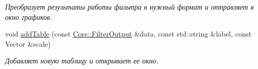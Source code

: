 \begin{DoxyCompactItemize}
\begin{DoxyCompactList}\small\item\em Преобразует результаты работы фильтра в нужный формат и отправляет в окно графиков. \end{DoxyCompactList}\item 
void \hyperlink{class_main_window_a2f45111c96d439beba735cd84e8deda7}{add\+Table} (const \hyperlink{namespace_core_a60877581a235fc9566087b54d463ce9c}{Core\+::\+Filter\+Output} \&data, const std\+::string \&label, const Vector \&scale)\hypertarget{class_main_window_a2f45111c96d439beba735cd84e8deda7}{}\label{class_main_window_a2f45111c96d439beba735cd84e8deda7}

\begin{DoxyCompactList}\small\item\em Добавляет новую таблицу и открывает ее окно. \end{DoxyCompactList}\end{DoxyCompactItemize}
